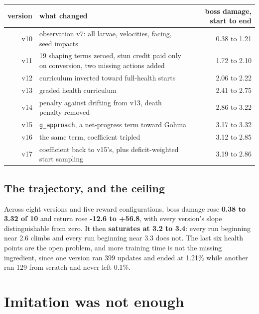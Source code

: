 \documentclass[11pt]{article}
\begin{document}
\begin{table}[!htbp]
  \centering
  \label{tab:whateachversionchangedandwha}
\begin{center}\small
\begin{tabularx}{\linewidth}{@{}rXr@{}}
\toprule
\textbf{version} & \textbf{what changed} & \textbf{boss damage, start to end} \\
\midrule
v10 & observation v7: all larvae, velocities, facing, seed impacts & 0.38 to 1.21 \\
v11 & 19 shaping terms zeroed, stun credit paid only on conversion, two missing actions added & 1.72 to 2.10 \\
v12 & curriculum inverted toward full-health starts & 2.06 to 2.22 \\
v13 & graded health curriculum & 2.41 to 2.75 \\
v14 & penalty against drifting from v13, death penalty removed & 2.86 to 3.22 \\
v15 & \texttt{g\_approach}, a net-progress term toward Gohma & 3.17 to 3.32 \\
v16 & the same term, coefficient tripled & 3.12 to 2.85 \\
v17 & coefficient back to v15's, plus deficit-weighted start sampling & 3.19 to 2.86 \\
\bottomrule
\end{tabularx}
\end{center}
\end{table}

\subsection{The trajectory, and the ceiling}
\label{sec:5.3.1}

Across eight versions and five reward configurations, boss damage rose \textbf{0.38 to 3.32 of 10} and return rose \textbf{-12.6 to +56.8}, with every version's slope distinguishable from zero. It then \textbf{saturates at 3.2 to 3.4}: every run beginning near 2.6 climbs and every run beginning near 3.3 does not. The last six health points are the open problem, and more training time is not the missing ingredient, since one version ran 399 updates and ended at 1.21\% while another ran 129 from scratch and never left 0.1\%.


\section{Imitation was not enough}
\label{sec:6}
\end{document}

